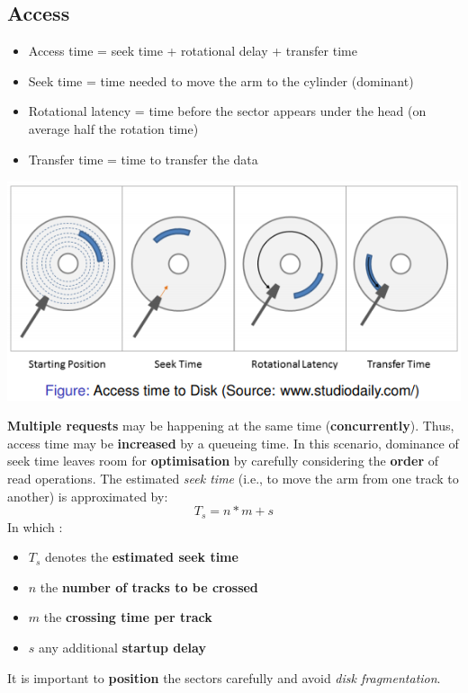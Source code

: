 \documentclass{article}
\begin{document}
\subsection{Access}
\begin{itemize}
	\item Access time = seek time + rotational delay + transfer time
	\item Seek time = time needed to move the arm to the cylinder (dominant)
	\item Rotational latency = time before the sector appears under the head (on average half the rotation time) 
	\item Transfer time = time to transfer the data
\end{itemize}
\begin{center}
	\includegraphics[scale=0.6]{hdd_access.png}
\end{center}
\pagebreak

\begin{flushleft}
\textbf{Multiple requests} may be happening at the same time (\textbf{concurrently}). Thus, access time may be \textbf{increased} by a queueing time. In this scenario, dominance of seek time leaves room for \textbf{optimisation} by carefully considering the \textbf{order} of read operations. The estimated \textit{seek time} (i.e., to move the arm from one track to another) is approximated by: \[T_{s} = n * m  + s \] In which :
\begin{itemize}
	\item $T_{s}$ denotes the \textbf{estimated seek time}
	\item $n$ the \textbf{number of tracks to be crossed}
	\item $m$ the \textbf{crossing time per track}
	\item $s$ any additional \textbf{startup delay}
\end{itemize}
It is important to \textbf{position} the sectors carefully and avoid \textit{disk fragmentation}.
\end{flushleft}
\end{document}
